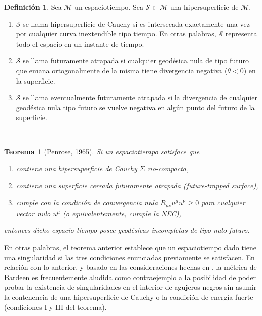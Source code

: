 \documentclass{article}
\numberwithin{equation}{section}
\newtheorem{theorem}{Teorema}[section]
\theoremstyle{definition}
\newtheorem{definition}{Definición}[section]
\begin{document}
\theoremstyle{definition}
\begin{definition}
	Sea $\mathcal{M}$ un espaciotiempo. Sea $\mathcal{S} \subset \mathcal{M}$ una hipersuperficie de $\mathcal{M}$.
	\begin{enumerate}[i]
		\item $\mathcal{S}$ se llama hipersuperficie de Cauchy si es intersecada exactamente una vez por cualquier curva inextendible tipo tiempo. En otras palabras, $\mathcal{S}$ representa todo el espacio en un instante de tiempo. 
		
		\item $\mathcal{S}$ se llama futuramente atrapada si cualquier geodésica nula de tipo futuro que emana ortogonalmente de la misma tiene divergencia negativa ($\theta < 0$) en la superficie.
		
		\item $\mathcal{S}$ se llama eventualmente futuramente atrapada si la divergencia de cualquier geodésica nula tipo futuro se vuelve negativa en algún punto del futuro de la superficie.
	\end{enumerate}
\end{definition}

\
\begin{theorem}[Penrose, 1965]
\label{penrose sing thm}
Si un espaciotiempo satisface que

\begin{enumerate}[i]
\item contiene una hipersuperficie de Cauchy $\Sigma$ no-compacta,

\item contiene una superficie cerrada futuramente atrapada (future-trapped surface),

\item cumple con la condición de convergencia nula $R_{\mu \nu}u^{\mu}u^{\nu} \geq 0$ para cualquier vector nulo $u^{\mu}$ (o equivalentemente, cumple la NEC),
\end{enumerate}

entonces dicho espacio tiempo posee geodésicas incompletas de tipo nulo futuro.
\end{theorem}

En otras palabras, el teorema anterior establece que un espaciotiempo dado tiene una singularidad si las tres condiciones enunciadas previamente se satisfacen. En relación con lo anterior, y basado en las consideraciones hechas en \cite{borde1994,borde1996}, la métrica de Bardeen es frecuentemente aludida como contraejemplo a la posibilidad de poder probar la existencia de singularidades en el interior de agujeros negros sin asumir la contenencia de una hipersuperficie de Cauchy o la condición de energía fuerte (condiciones I y III del teorema).\\
\end{document}
